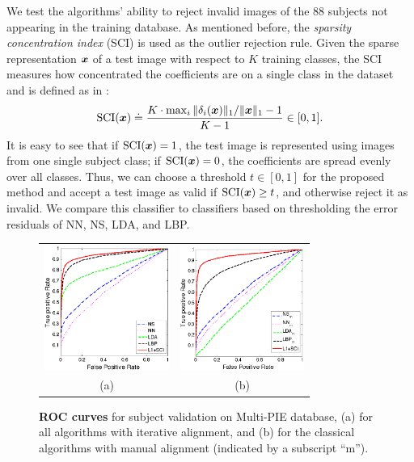 \documentclass[10pt,journal,letterpaper,compsoc]{IEEEtran} %
\begin{document}
We test the algorithms' ability to reject invalid images of the
88 subjects not appearing in the training database. As
mentioned before, the \emph{sparsity concentration index} (SCI)
is used as the outlier rejection rule. Given the sparse
representation ${\boldsymbol{x}}$ of a test image with respect to $K$
training classes, the SCI measures how concentrated the
coefficients are on a single class in the dataset and is
defined as in \cite{Wright2009-PAMI}:
\begin{displaymath}
\textup{SCI}({\boldsymbol{x}}) \doteq \frac{K \cdot \max_i \|\delta_i({\boldsymbol{x}})\|_1 /
\|{\boldsymbol{x}}\|_1 - 1}{K - 1} \in [0,1] .
\end{displaymath}
It is easy to see that if $\textup{SCI}({\boldsymbol{x}}) = 1$, the test
image is represented using images from one single subject
class; if $\textup{SCI}({\boldsymbol{x}}) = 0$, the coefficients are spread
evenly over all classes. Thus, we can choose a threshold $t \in
[0,1]$ for the proposed method and accept a test image as valid
if $\textup{SCI}({\boldsymbol{x}}) \geq t$, and otherwise reject it as
invalid. We compare this classifier to classifiers based on
thresholding the error residuals of NN, NS, LDA, and LBP.
\begin{figure}[t]
{\small
\centering
\begin{tabular}{@{}c@{}c@{}}
\includegraphics[height = 1.6in]{figures_pami/pami_roc_revision2} & \hspace{2mm}
\includegraphics[height = 1.6in]{figures_pami/pami_roc2} \\
(a) & \hspace{2mm}(b) \\
\end{tabular}
}
\vspace{-2mm}
\caption{{\bf ROC curves} for subject validation on Multi-PIE database,
(a) for all algorithms with iterative alignment, and
(b) for the classical algorithms with manual alignment (indicated by a subscript ``m'').}\label{fig:roc-multipie}
\vspace{-2mm}
\end{figure}
\end{document}
